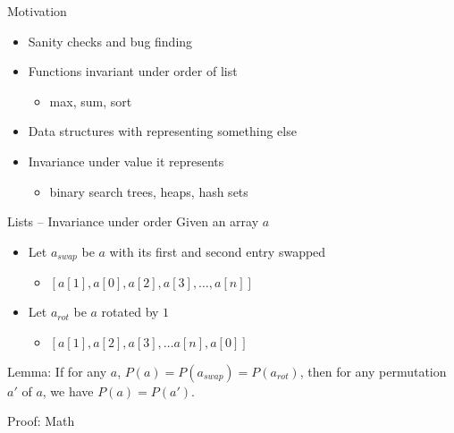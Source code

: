 \documentclass[usenames,dvipsnames]{beamer}
\begin{document}
\begin{frame}[fragile]{Motivation}
  \begin{itemize}
    \item Sanity checks and bug finding
    \vfill
    \item Functions invariant under order of list
    \begin{itemize}
      \item max, sum, sort
    \end{itemize}
    \vfill
    \item Data structures with representing something else
    \item Invariance under value it represents
    \begin{itemize}
      \item binary search trees, heaps, hash sets
    \end{itemize}
  \end{itemize}
\end{frame}

\begin{frame}[fragile]{Lists -- Invariance under order}
  Given an array $a$
  \begin{itemize}
    \item Let $a_{swap}$ be $a$ with its first and second entry swapped
    \begin{itemize}
      \item $[ a[1], a[0], a[2], a[3], \ldots, a[n] ]$
    \end{itemize}
    \item Let $a_{rot}$ be $a$ rotated by $1$
    \begin{itemize}
      \item $[ a[1], a[2], a[3], \ldots  a[n], a[0] ]$
    \end{itemize}
  \end{itemize}
  \vfill
  Lemma: If for any $a$, $P(a) = P(a_{swap}) = P(a_{rot})$,
  then for any permutation $a'$ of $a$,
  we have $P(a) = P(a')$.

  Proof: Math
\end{frame}
\end{document}
